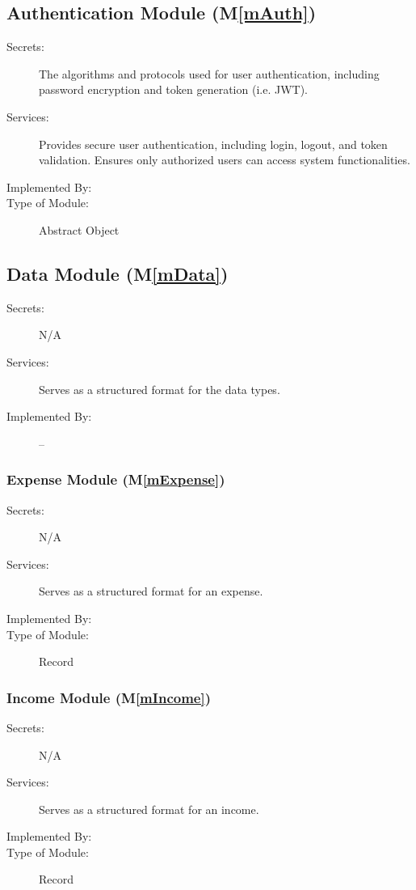 \documentclass[12pt, titlepage]{article}
\newcommand{\mref}[1]{M\ref{#1}}
\begin{document}
\subsection{Authentication Module (\mref{mAuth})}

\begin{description}
\item[Secrets:] The algorithms and protocols used for user authentication, including password encryption and token generation (i.e. JWT).
\item[Services:] Provides secure user authentication, including login, logout, and token validation. Ensures only authorized users can access system functionalities.
\item[Implemented By:] \progname
\item[Type of Module:] Abstract Object
\end{description}

\subsection{Data Module (\mref{mData})}

\begin{description}
\item[Secrets:] N/A
\item[Services:] Serves as a structured format for the data types.
\item[Implemented By:] --
\end{description}


\subsubsection{Expense Module (\mref{mExpense})}

\begin{description}
\item[Secrets:] N/A
\item[Services:] Serves as a structured format for an expense.
\item[Implemented By:] \progname
\item[Type of Module:] Record
\end{description}

\subsubsection{Income Module (\mref{mIncome})}

\begin{description}
\item[Secrets:] N/A
\item[Services:] Serves as a structured format for an income.
\item[Implemented By:] \progname
\item[Type of Module:] Record
\end{description}
\end{document}
